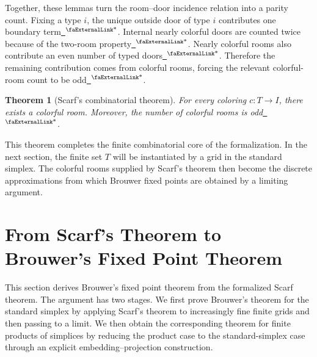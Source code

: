 \documentclass{article}
\newtheorem{theorem}{Theorem}[section]
\theoremstyle{definition}
\newcommand{\extlink}{~\ensuremath{{}^\text{\faExternalLink*}}}
\begin{document}
Together, these lemmas turn the room--door incidence relation into a parity count. Fixing a type $i$, the unique outside door of type $i$ contributes one boundary term\href{https://github.com/Solo-ary/Game-Theory-Formalization/blob/7b49d5267d4f26b17bdf071250880b63e96999b6/Brouwer/Gametheory/Scarf.lean#L2223-L2343}{\extlink}. Internal nearly colorful doors are counted twice because of the two-room property\href{https://github.com/Solo-ary/Game-Theory-Formalization/blob/7b49d5267d4f26b17bdf071250880b63e96999b6/Brouwer/Gametheory/Scarf.lean#L2345-L2457}{\extlink}. Nearly colorful rooms also contribute an even number of typed doors\href{https://github.com/Solo-ary/Game-Theory-Formalization/blob/7b49d5267d4f26b17bdf071250880b63e96999b6/Brouwer/Gametheory/Scarf.lean#L2470-L2562}{\extlink}. Therefore the remaining contribution comes from colorful rooms, forcing the relevant colorful-room count to be odd\href{https://github.com/Solo-ary/Game-Theory-Formalization/blob/7b49d5267d4f26b17bdf071250880b63e96999b6/Brouwer/Gametheory/Scarf.lean#L2579-L2585}{\extlink}.

\begin{theorem}[Scarf's combinatorial theorem]\label{thm:Scarf}
For every coloring $c : T \to I$, there exists a colorful room. Moreover, the number of colorful rooms is odd\href{https://github.com/Solo-ary/Game-Theory-Formalization/blob/7b49d5267d4f26b17bdf071250880b63e96999b6/Brouwer/Gametheory/Scarf.lean#L2587-L2595}{\extlink}.
\end{theorem}

This theorem completes the finite combinatorial core of the formalization. In the next section, the finite set $T$ will be instantiated by a grid in the standard simplex. The colorful rooms supplied by Scarf's theorem then become the discrete approximations from which Brouwer fixed points are obtained by a limiting argument.







\section{From Scarf's Theorem to Brouwer's Fixed Point Theorem}\label{sec:Brouwer}

This section derives Brouwer's fixed point theorem from the formalized Scarf theorem. The argument has two stages. We first prove Brouwer's theorem for the standard simplex by applying Scarf's theorem to increasingly fine finite grids and then passing to a limit. We then obtain the corresponding theorem for finite products of simplices by reducing the product case to the standard-simplex case through an explicit embedding--projection construction.
\end{document}
